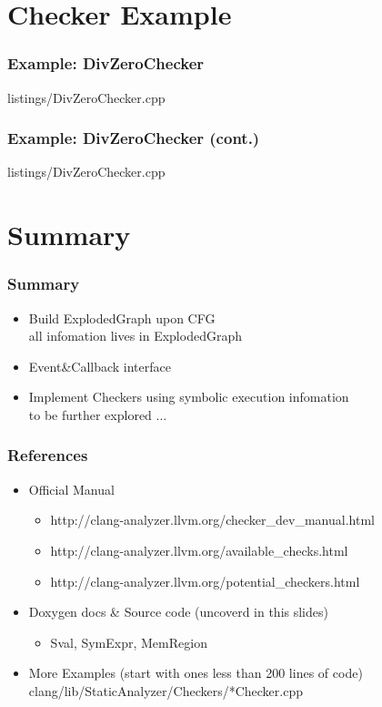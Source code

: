 \documentclass[]{beamer}
\begin{document}
\section{Checker Example}
\frame{\tableofcontents[currentsection]}

\begin{frame}
  \frametitle{Example: DivZeroChecker}
  
                  {listings/DivZeroChecker.cpp}
\end{frame}

\begin{frame}
  \frametitle{Example: DivZeroChecker (cont.)}
  
                  {listings/DivZeroChecker.cpp}
\end{frame}

\section{Summary}
\frame{\tableofcontents[currentsection]}

\begin{frame}
  \frametitle{Summary}
  \begin{itemize}
    \item Build ExplodedGraph upon CFG\\
      all infomation lives in ExplodedGraph
    \item Event\&Callback interface
    \item Implement Checkers using symbolic execution infomation\\
      \alert{to be further explored ...}
  \end{itemize}
\end{frame}

\begin{frame}
\frametitle{References}
  \begin{itemize}
    \item Official Manual
      \begin{itemize}
        \item http://clang-analyzer.llvm.org/checker\_dev\_manual.html
        \item http://clang-analyzer.llvm.org/available\_checks.html
        \item http://clang-analyzer.llvm.org/potential\_checkers.html
      \end{itemize}
    \item Doxygen docs \& Source code (uncoverd in this slides)
      \begin{itemize}
        \item Sval, SymExpr, MemRegion
      \end{itemize}
    \item More Examples (start with ones less than 200 lines of code)\\
      clang/lib/StaticAnalyzer/Checkers/*Checker.cpp
  \end{itemize}
\end{frame}

\end{document}
